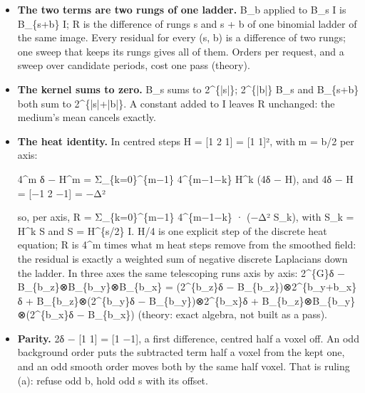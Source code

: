 \begin{itemize}
\item \textbf{The two terms are two rungs of one ladder.} B\_\allowbreak{}b applied to B\_\allowbreak{}s I is B\_\allowbreak{}\{s+b\} I; R is the difference of rungs s and s + b of one binomial ladder of the same image. Every residual for every (s, b) is a difference of two rungs; one sweep that keeps its rungs gives all of them. Orders per request, and a sweep over candidate periods, cost one pass (theory).
\item \textbf{The kernel sums to zero.} B\_\allowbreak{}s sums to 2\textasciicircum{}\{|s|\}; 2\textasciicircum{}\{|b|\} B\_\allowbreak{}s and B\_\allowbreak{}\{s+b\} both sum to 2\textasciicircum{}\{|s|+|b|\}. A constant added to I leaves R unchanged: the medium's mean cancels exactly.
\item \textbf{The heat identity.} In centred steps H = [1 2 1] = [1 1]², with m = b/2 per axis:

4\textasciicircum{}m δ − H\textasciicircum{}m = Σ\_\allowbreak{}\{k=0\}\textasciicircum{}\{m−1\} 4\textasciicircum{}\{m−1−k\} H\textasciicircum{}k (4δ − H),  and 4δ − H = [−1 2 −1] = −Δ²

so, per axis, R = Σ\_\allowbreak{}\{k=0\}\textasciicircum{}\{m−1\} 4\textasciicircum{}\{m−1−k\} · (−Δ² S\_\allowbreak{}k), with S\_\allowbreak{}k = H\textasciicircum{}k S and S = H\textasciicircum{}\{s/2\} I. H/4 is one explicit step of the discrete heat equation; R is 4\textasciicircum{}m times what m heat steps remove from the smoothed field: the residual is exactly a weighted sum of negative discrete Laplacians down the ladder. In three axes the same telescoping runs axis by axis: 2\textasciicircum{}\{G\}δ − B\_\allowbreak{}\{b\_\allowbreak{}z\}⊗B\_\allowbreak{}\{b\_\allowbreak{}y\}⊗B\_\allowbreak{}\{b\_\allowbreak{}x\} = (2\textasciicircum{}\{b\_\allowbreak{}z\}δ − B\_\allowbreak{}\{b\_\allowbreak{}z\})⊗2\textasciicircum{}\{b\_\allowbreak{}y+b\_\allowbreak{}x\}δ + B\_\allowbreak{}\{b\_\allowbreak{}z\}⊗(2\textasciicircum{}\{b\_\allowbreak{}y\}δ − B\_\allowbreak{}\{b\_\allowbreak{}y\})⊗2\textasciicircum{}\{b\_\allowbreak{}x\}δ + B\_\allowbreak{}\{b\_\allowbreak{}z\}⊗B\_\allowbreak{}\{b\_\allowbreak{}y\}⊗(2\textasciicircum{}\{b\_\allowbreak{}x\}δ − B\_\allowbreak{}\{b\_\allowbreak{}x\}) (theory: exact algebra, not built as a pass).
\item \textbf{Parity.} 2δ − [1 1] = [1 −1], a first difference, centred half a voxel off. An odd background order puts the subtracted term half a voxel from the kept one, and an odd smooth order moves both by the same half voxel. That is ruling (a): refuse odd b, hold odd s with its offset.
\end{itemize}

